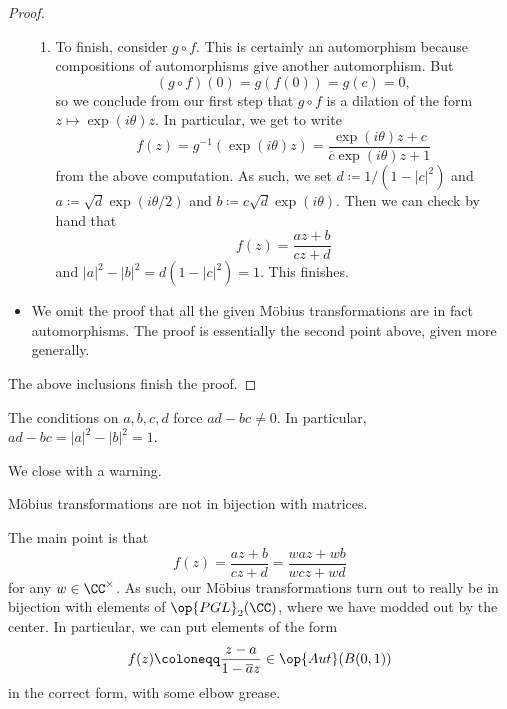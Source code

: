 \begin{proof}
\begin{itemize}
\begin{enumerate}
			\item To finish, consider $g\circ f$. This is certainly an automorphism because compositions of automorphisms give another automorphism. But
			\[(g\circ f)(0)=g(f(0))=g(c)=0,\]
			so we conclude from our first step that $g\circ f$ is a dilation of the form $z\mapsto\exp(i\theta)z$. In particular, we get to write
			\[f(z)=g^{-1}(\exp(i\theta)z)=\frac{\exp(i\theta)z+c}{\overline c\exp(i\theta)z+1}\]
			from the above computation. As such, we set $d\coloneqq 1/\left(1-|c|^2\right)$ and $a\coloneqq\sqrt d\exp(i\theta/2)$ and $b\coloneqq c\sqrt d\exp(i\theta)$. Then we can check by hand that
			\[f(z)=\frac{az+b}{cz+d}\]
			and $|a|^2-|b|^2=d\left(1-|c|^2\right)=1$. This finishes.
		\end{enumerate}
		\item We omit the proof that all the given M\"obius transformations are in fact automorphisms. The proof is essentially the second point above, given more generally.
	\end{itemize}
	The above inclusions finish the proof.
\end{proof}
\begin{remark}
	The conditions on $a,b,c,d$ force $ad-bc\ne0$. In particular, $ad-bc=|a|^2-|b|^2=1$.
\end{remark}
We close with a warning.
\begin{warn}
	M\"obius transformations are not in bijection with matrices.
\end{warn}
The main point is that
\[f(z)=\frac{az+b}{cz+d}=\frac{waz+wb}{wcz+wd}\]
for any $w\in\CC^\times$. As such, our M\"obius transformations turn out to really be in bijection with elements of $\op{PGL}_2(\CC)$, where we have modded out by the center. In particular, we can put elements of the form
\[f(z)\coloneqq\frac{z-a}{1-\overline az}\in\op{Aut}(B(0,1))\]
in the correct form, with some elbow grease.